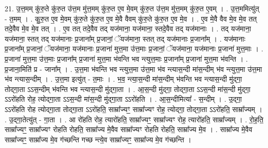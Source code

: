 \documentclass[17pt]{extarticle}
\begin{document}
21. उ॒त्त॒मम् कु॑रु॒ते कु॑रु॒त उ॑त्त॒म मु॑त्त॒मम् कु॑रु॒त ए॒व मे॒वम् कु॑रु॒त उ॑त्त॒म मु॑त्त॒मम् कु॑रु॒त ए॒वम् । . उ॒त्त॒ममित्यु॑त् - त॒मम् । . कु॒रु॒त ए॒व मे॒वम् कु॑रु॒ते कु॑रु॒त ए॒व मे॒वै वैवम् कु॑रु॒ते कु॑रु॒त ए॒व मे॒व । . ए॒व मे॒वै वैव मे॒व मे॒व तत् तदे॒वैव मे॒व मे॒व तत् । . ए॒व तत् तदे॒वैव तद् यज॑माना॒ यज॑माना॒ स्तदे॒वैव तद् यज॑मानाः । . तद् यज॑माना॒ यज॑माना॒ स्तत् तद् यज॑मानाः प्र॒जाना᳚म् प्र॒जानां॒ ॅयज॑माना॒ स्तत् तद् यज॑मानाः प्र॒जाना᳚म् । . यज॑मानाः प्र॒जाना᳚म् प्र॒जानां॒ ॅयज॑माना॒ यज॑मानाः प्र॒जाना॑ मुत्त॒मा उ॑त्त॒माः प्र॒जानां॒ ॅयज॑माना॒ यज॑मानाः प्र॒जाना॑ मुत्त॒माः । . प्र॒जाना॑ मुत्त॒मा उ॑त्त॒माः प्र॒जाना᳚म् प्र॒जाना॑ मुत्त॒मा भ॑वन्ति भव न्त्युत्त॒माः प्र॒जाना᳚म् प्र॒जाना॑ मुत्त॒मा भ॑वन्ति । . प्र॒जाना॒मिति॑ प्र - जाना᳚म् । . उ॒त्त॒मा भ॑वन्ति भव न्त्युत्त॒मा उ॑त्त॒मा भ॑व न्त्यास॒न्दी मा॑स॒न्दीम् भ॑व न्त्युत्त॒मा उ॑त्त॒मा भ॑व न्त्यास॒न्दीम् । . उ॒त्त॒मा इत्यु॑त् - त॒माः । . भ॒व॒ न्त्या॒स॒न्दी मा॑स॒न्दीम् भ॑वन्ति भव न्त्यास॒न्दी मु॑द्‍गा॒ तोद्‍गा॒ता ऽऽस॒न्दीम् भ॑वन्ति भव न्त्यास॒न्दी मु॑द्‍गा॒ता । . आ॒स॒न्दी मु॑द्‍गा॒ तोद्‍गा॒ता ऽऽस॒न्दी मा॑स॒न्दी मु॑द्‍गा॒ ऽऽरो॑हति रोह॒ त्योद्‍गा॒ता ऽऽस॒न्दी मा॑स॒न्दी मु॑द्‍गा॒ता ऽऽरो॑हति । . आ॒स॒न्दीमित्या᳚ - स॒न्दीम् । . उ॒द्‍गा॒ ऽऽरो॑हति रोह त्योद्‍गा॒ता तोद्‍गा॒ता ऽऽरो॑हति॒ साम्रा᳚ज्यꣳ॒॒ साम्रा᳚ज्यꣳ रोह॒ त्योद्‍गा॒ तोद्‍गा॒ता ऽऽरो॑हति॒ साम्रा᳚ज्यम् । . उ॒द्‍गा॒तेत्यु॑त् - गा॒ता । . आ रो॑हति रोह॒ त्यारो॑हति॒ साम्रा᳚ज्यꣳ॒॒ साम्रा᳚ज्यꣳ रोह॒ त्यारो॑हति॒ साम्रा᳚ज्यम् । . रो॒ह॒ति॒ साम्रा᳚ज्यꣳ॒॒ साम्रा᳚ज्यꣳ रोहति रोहति॒ साम्रा᳚ज्य मे॒वैव साम्रा᳚ज्यꣳ रोहति रोहति॒ साम्रा᳚ज्य मे॒व । . साम्रा᳚ज्य मे॒वैव साम्रा᳚ज्यꣳ॒॒ साम्रा᳚ज्य मे॒व ग॑च्छन्ति गच्छ न्त्ये॒व साम्रा᳚ज्यꣳ॒॒ साम्रा᳚ज्य मे॒व ग॑च्छन्ति । \newline
\end{document}
